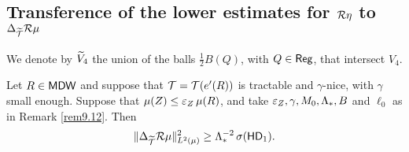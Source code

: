 \vv







\subsection{Transference of the lower estimates for \texorpdfstring{${\mathcal R}\eta$}{R eta} to \texorpdfstring{$\Delta_{{\widetilde{{\mathcal T}}}}{\mathcal R}\mu$}{Delta\_T R mu}}

We denote by ${\widetilde{V}}_4$ the union of the balls $\frac12B(Q)$, with $Q\in{\mathsf{Reg}}$, that intersect $V_4$.

\vv

\begin{lemma}\label{lemalter*}
Let $R\in{\mathsf{MDW}}$ and suppose that ${\mathcal T}={\mathcal T}(e'(R))$ is tractable and $\gamma$-nice, with $\gamma$ small enough.
Suppose that $\mu(Z)\leq {\varepsilon}_Z\,\mu(R)$, and take ${\varepsilon}_Z,\gamma,M_0,\Lambda_*,B$ and $\ell_0$ as in Remark \ref{rem9.12}. 
Then 
$$\|\Delta_{{\widetilde{{\mathcal T}}}} {\mathcal R}\mu\|_{L^2(\mu)}^2\geq \Lambda_*^{-2}\,\sigma({\mathsf{HD}}_1).$$
\end{lemma}

